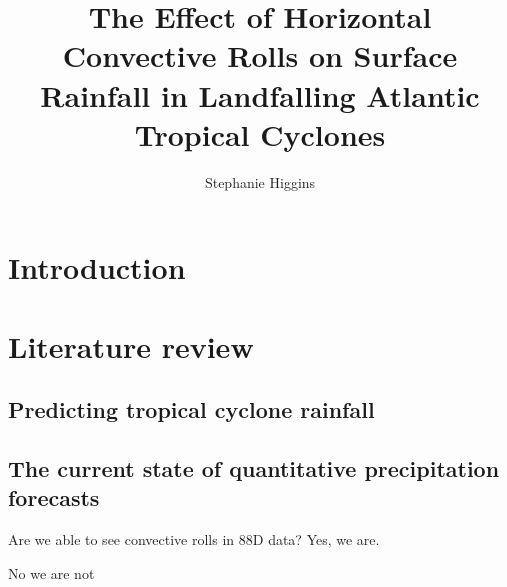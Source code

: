 \documentclass[12pt]{article}
\author{Stephanie Higgins} \title{The Effect of Horizontal Convective Rolls on Surface Rainfall in Landfalling Atlantic Tropical Cyclones}
\begin{document}
\maketitle


\section{Introduction}

\section{Literature review}

\subsection{Predicting tropical cyclone rainfall} 

\subsection{The current state of quantitative precipitation forecasts}

Are we able to see convective rolls in 88D data?
Yes, we are.

No we are not
\end{document}

